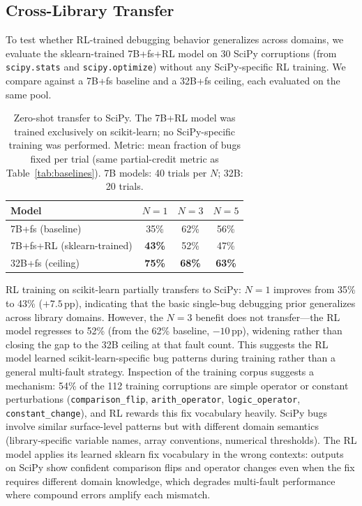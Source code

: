\documentclass[12pt]{article}
\begin{document}
\subsection{Cross-Library Transfer}
\label{sec:transfer}

To test whether RL-trained debugging behavior generalizes across domains, we
evaluate the sklearn-trained 7B+fs+RL model on 30 SciPy corruptions (from
\texttt{scipy.stats} and \texttt{scipy.optimize}) without any SciPy-specific
RL training. We compare against a 7B+fs baseline and a 32B+fs ceiling, each
evaluated on the same pool.

\begin{table}[h]
\centering
\caption{Zero-shot transfer to SciPy. The 7B+RL model was trained exclusively
  on scikit-learn; no SciPy-specific training was performed. Metric: mean fraction
  of bugs fixed per trial (same partial-credit metric as Table~\ref{tab:baselines}).
  7B models: 40 trials per $N$; 32B: 20 trials.}
\label{tab:scipy}
\begin{tabular}{lccc}
\toprule
Model & $N{=}1$ & $N{=}3$ & $N{=}5$ \\
\midrule
7B+fs (baseline)          & 35\% & 62\% & 56\% \\
7B+fs+RL (sklearn-trained) & \textbf{43\%} & 52\% & 47\% \\
\midrule
32B+fs (ceiling)          & \textbf{75\%} & \textbf{68\%} & \textbf{63\%} \\
\bottomrule
\end{tabular}
\end{table}

RL training on scikit-learn partially transfers to SciPy: $N{=}1$ improves
from 35\% to 43\% ($+7.5$\,pp), indicating that the basic single-bug
debugging prior generalizes across library domains. However, the $N{=}3$
benefit does not transfer---the RL model regresses to 52\% (from the 62\%
baseline, $-10$\,pp), widening rather than closing the gap to the 32B ceiling
at that fault count. This suggests the RL model learned scikit-learn-specific
bug patterns during training rather than a general multi-fault strategy.
Inspection of the training corpus suggests a mechanism: 54\% of the 112
training corruptions are simple operator or constant perturbations
(\texttt{comparison\_flip}, \texttt{arith\_operator}, \texttt{logic\_operator},
\texttt{constant\_change}), and RL rewards this fix vocabulary heavily.
SciPy bugs involve similar surface-level patterns but with different
domain semantics (library-specific variable names, array conventions, numerical
thresholds). The RL model applies its learned sklearn fix vocabulary in the
wrong contexts: outputs on SciPy show confident comparison flips and operator
changes even when the fix requires different domain knowledge, which degrades
multi-fault performance where compound errors amplify each mismatch.
\end{document}
